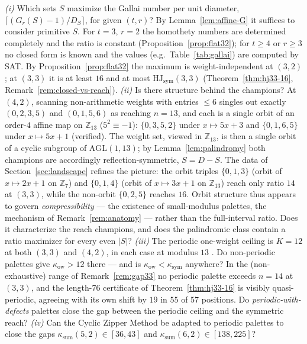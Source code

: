 \documentclass[12pt]{article}
\newcommand{\HJ}{\mathrm{HJ}}
\newcommand{\Z}{\mathbb{Z}}
\newcommand{\ksum}{\kappa_{\mathrm{sum}}}
\newcommand{\kow}{\kappa_{\mathrm{ow}}}
\newcommand{\ksym}{\kappa_{\mathrm{sym}}}
\begin{document}
\begin{question}\label{q:weights}
\emph{(i)} Which sets $S$ maximize the Gallai number per unit diameter,
$\lceil(G_{r}(S)-1)/D_{S}\rceil$, for given $(t,r)$? By
Lemma~\ref{lem:affine-G} it suffices to consider primitive $S$. For
$t=3$, $r=2$ the homothety numbers are determined completely and the
ratio is constant (Proposition~\ref{prop:flat32}); for $t\ge 4$ or
$r\ge 3$ no closed form is known and the values (e.g.\
Table~\ref{tab:gallai}) are computed by SAT. By
Proposition~\ref{prop:flat32} the maximum is weight-independent at
$(3,2)$; at $(3,3)$ it is at least $16$ and at most
$\HJ_{\mathrm{sym}}(3,3)$ (Theorem~\ref{thm:hj33-16},
Remark~\ref{rem:closed-vs-reach}).
\emph{(ii)} Is there structure behind the champions? At $(4,2)$,
scanning non-arithmetic weights with entries $\le 6$ singles out
exactly $(0,2,3,5)$ and $(0,1,5,6)$ as reaching $n=13$, and each is a
single orbit of an order-$4$ affine map on $\Z_{13}$
($5^{2}\equiv-1$): $\{0,3,5,2\}$ under $x\mapsto 5x+3$ and
$\{0,1,6,5\}$ under $x\mapsto 5x+1$ (verified). The weight set, viewed
in $\Z_{13}$, is then a single orbit of a cyclic subgroup of
$\mathrm{AGL}(1,13)$; by Lemma~\ref{lem:palindromy} both champions are
accordingly reflection-symmetric, $S=D-S$. The data of
Section~\ref{sec:landscape} refines the picture: the orbit triples
$\{0,1,3\}$ (orbit of $x\mapsto 2x+1$ on $\Z_{7}$) and $\{0,1,4\}$
(orbit of $x\mapsto 3x+1$ on $\Z_{13}$) reach only ratio $14$ at
$(3,3)$, while the non-orbit $\{0,2,5\}$ reaches $16$. Orbit structure
thus appears to govern \emph{compressibility} --- the existence of
small-modulus palettes, the mechanism of Remark~\ref{rem:anatomy} ---
rather than the full-interval ratio. Does it characterize the reach
champions, and does the palindromic class contain a ratio maximizer for
every even $|S|$?
\emph{(iii)} The periodic one-weight ceiling is $K=12$ at both $(3,3)$
and $(4,2)$, in each case at modulus $13$ \cite{thesis}. Do
non-periodic palettes give $\kow>12$ there --- and is $\kow<\ksym$
anywhere? In the (non-exhaustive) range of Remark~\ref{rem:gap33} no
periodic palette exceeds $n=14$ at $(3,3)$, and the length-$76$
certificate of Theorem~\ref{thm:hj33-16} is visibly quasi-periodic,
agreeing with its own shift by $19$ in $55$ of $57$ positions. Do
\emph{periodic-with-defects} palettes close the gap between the
periodic ceiling and the symmetric reach?
\emph{(iv)} Can the Cyclic Zipper Method
\cite{HerwigHeuleZipper2007,RabungLotts2012} be adapted to periodic
palettes to close the gaps $\ksum(5,2)\in[36,43]$ and
$\ksum(6,2)\in[138,225]$?
\end{question}
\end{document}
